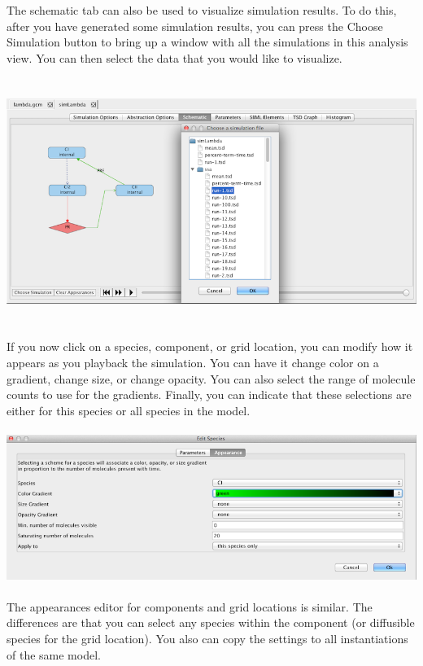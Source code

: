 \documentclass[titlepage,11pt]{article}
\begin{document}
The schematic tab can also be used to visualize simulation results.  To do this, after you have generated some simulation results, you can press the Choose Simulation button to bring up a window with all the simulations in this analysis view.  You can then select the data that you would like to visualize.

\begin{center}
\includegraphics[height=80mm]{screenshots/chooseSim}
\end{center}

If you now click on a species, component, or grid location, you can modify how it appears as you playback the simulation.  You can have it change color on a gradient, change size, or change opacity.  You can also select the range of molecule counts to use for the gradients.  Finally, you can indicate that these selections are either for this species or all species in the model.  

\begin{center}
\includegraphics[height=50mm]{screenshots/editSpeciesAppearance}
\end{center}

The appearances editor for components and grid locations is similar.  The differences are that you can select any species within the component (or diffusible species for the grid location).  You also can copy the settings to all instantiations of the same model.
\end{document}
